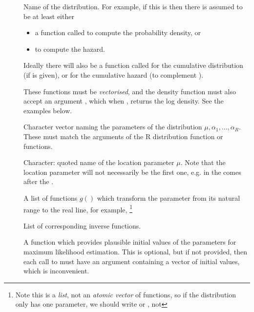 \documentclass[nojss,nofooter]{jss}
\begin{document}
\begin{description}
\item[] Name of the distribution.  For example, if this is  then there is assumed to be at least either 
  
  \begin{itemize}
  \item  a function called  to compute the probability density, or 
  \item {} to compute the hazard.  
  \end{itemize}
  
  Ideally there will also be a function called  for the
  cumulative distribution (if  is given), or  for the
  cumulative hazard (to complement ).
  
  These functions must be \emph{vectorised}, and the density function
  must also accept an argument , which when ,
  returns the log density.  See the examples below.
  
\item[] Character vector naming the parameters of the
  distribution $\mu,\alpha_1,...,\alpha_R$.  These must match the
  arguments of the R distribution function or functions.
  
\item[] Character: quoted name of the location parameter $\mu$.
  Note that the location parameter will not necessarily be the first one, e.g. 
  in  the  comes after the .
  
\item[] A list of functions $g()$ which transform the parameter from its natural range to the real line, for example,  \footnote{Note this is a \emph{list}, not an \emph{atomic vector} of functions, so if the distribution only has one parameter, we should write  or , not }

\item[] List of corresponding inverse functions.

\item[] A function which provides plausible initial values
  of the parameters for maximum likelihood estimation.  This is
  optional, but if not provided, then each call to 
  must have an  argument containing a vector of initial
  values, which is inconvenient.
  

\end{description}
\end{document}
